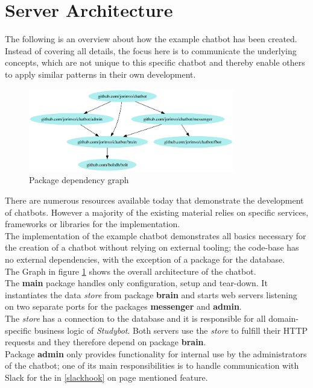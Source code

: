 \section{Server Architecture}

The following is an overview about how the example chatbot has been created.
\\
Instead of covering all details, the focus here is to communicate the underlying concepts,
which are not unique to this specific chatbot and thereby enable others to apply similar patterns in their own development.
\\

\begin{figure}[h]
  \centering
  \includegraphics[width=0.8\textwidth]{images/internal-deps.png}
  \caption{Package dependency graph\footnotemark}
	\label{fig:internal-deps}
\end{figure}

There are numerous resources available today that demonstrate the development of chatbots.
However a majority of the existing material relies on specific services, frameworks or libraries for the implementation.
\\
The implementation of the example chatbot demonstrates all basics necessary for the creation of a chatbot
without relying on external tooling;
the code-base has no external dependencies, with the exception of a package for the database.
\\

The Graph in figure \ref{fig:internal-deps} shows the overall architecture of the chatbot.
\\
The \textbf{main} package handles only configuration, setup and tear-down.
It instantiates the data \emph{store} from package \textbf{brain}
and starts web servers listening on two separate ports for the packages \textbf{messenger} and \textbf{admin}.
\\

The \emph{store} has a connection to the database and it is responsible for all domain-specific business logic of \emph{Studybot}.
Both servers use the \emph{store} to fulfill their HTTP requests and they therefore depend on package \textbf{brain}.
\\
Package \textbf{admin} only provides functionality for internal use by the administrators of the chatbot;
one of its main responsibilities is to handle communication with Slack
for the in \ref{slackhook} on page \pageref{slackhook} mentioned feature.
\\

